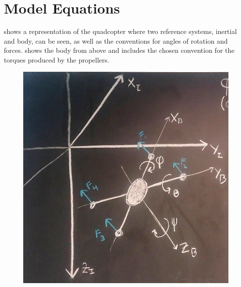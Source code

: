 \section{Model Equations}
 shows a representation of the quadcopter where two reference systems, inertial and body, can be seen, as well as the conventions for angles of rotation and forces.  shows the body from above and includes the chosen convention for the torques produced by the propellers.
 
\begin{minipage}{\linewidth}
	\begin{minipage}{0.45\linewidth}
		\begin{figure}[H]
			\includegraphics[scale=.27]{figures/drone_diagram}
			\centering
			\captionsetup{justification=centering}
			\label{diagramQuad}
		\end{figure}
	\end{minipage}
	\hspace{0.03\linewidth}
	\begin{minipage}{0.45\linewidth}
		\begin{figure}[H] \vspace{16mm}

\end{figure}
\end{minipage}
\end{minipage}
